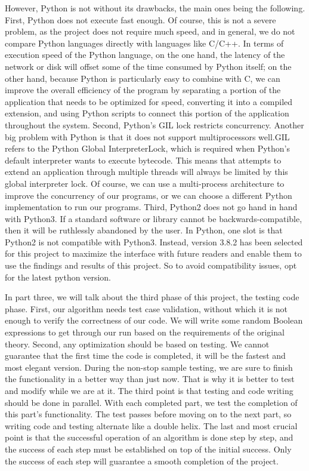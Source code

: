 \documentclass{sigchi}
\begin{document}
However, Python is not without its drawbacks, the main ones being the following. First, Python does not execute fast enough. Of course, this is not a severe problem, as the project does not require much speed, and in general, we do not compare Python languages directly with languages like C/C++. In terms of execution speed of the Python language, on the one hand, the latency of the network or disk will offset some of the time consumed by Python itself; on the other hand, because Python is particularly easy to combine with C, we can improve the overall efficiency of the program by separating a portion of the application that needs to be optimized for speed, converting it into a compiled extension, and using Python scripts to connect this portion of the application throughout the system. Second, Python's GIL lock restricts concurrency. Another big problem with Python is that it does not support multiprocessors well.GIL refers to the Python Global InterpreterLock, which is required when Python's default interpreter wants to execute bytecode. This means that attempts to extend an application through multiple threads will always be limited by this global interpreter lock. Of course, we can use a multi-process architecture to improve the concurrency of our programs, or we can choose a different Python implementation to run our programs. Third, Python2 does not go hand in hand with Python3. If a standard software or library cannot be backwards-compatible, then it will be ruthlessly abandoned by the user. In Python, one slot is that Python2 is not compatible with Python3. Instead, version 3.8.2 has been selected for this project to maximize the interface with future readers and enable them to use the findings and results of this project. So to avoid compatibility issues, opt for the latest python version.

In part three, we will talk about the third phase of this project, the testing code phase. First, our algorithm needs test case validation, without which it is not enough to verify the correctness of our code. We will write some random Boolean expressions to get through our run based on the requirements of the original theory. Second, any optimization should be based on testing. We cannot guarantee that the first time the code is completed, it will be the fastest and most elegant version. During the non-stop sample testing, we are sure to finish the functionality in a better way than just now. That is why it is better to test and modify while we are at it. The third point is that testing and code writing should be done in parallel. With each completed part, we test the completion of this part's functionality. The test passes before moving on to the next part, so writing code and testing alternate like a double helix. The last and most crucial point is that the successful operation of an algorithm is done step by step, and the success of each step must be established on top of the initial success. Only the success of each step will guarantee a smooth completion of the project.
\end{document}
